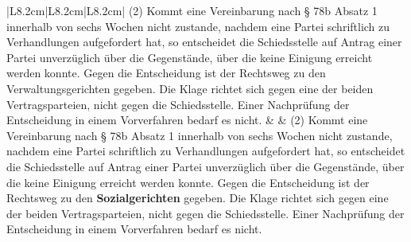 \documentclass[10pt,a4paper,landscape]{article}
\begin{document}
\begin{longtable}{|L{8.2cm}|L{8.2cm}|L{8.2cm}|}
(2) Kommt eine Vereinbarung nach \S{} 78b  \newline Absatz 1 innerhalb von sechs Wochen  \newline nicht zustande, nachdem eine Partei  \newline schriftlich zu Verhandlungen aufgefordert  \newline hat, so entscheidet die Schiedsstelle auf  \newline Antrag einer Partei unverzüglich über die  \newline Gegenstände, über die keine Einigung  \newline erreicht werden konnte. Gegen die  \newline Entscheidung ist der Rechtsweg zu den  \newline \textcolor{diffred}{Verwaltungsgerichten} gegeben. Die Klage  \newline richtet sich gegen eine der beiden  \newline Vertragsparteien, nicht gegen die  \newline Schiedsstelle. Einer Nachprüfung der  \newline Entscheidung in einem Vorverfahren bedarf  \newline es nicht. &  & (2) Kommt eine Vereinbarung nach \S{} 78b  \newline Absatz 1 innerhalb von sechs Wochen  \newline nicht zustande, nachdem eine Partei  \newline schriftlich zu Verhandlungen aufgefordert  \newline hat, so entscheidet die Schiedsstelle auf  \newline Antrag einer Partei unverzüglich über die  \newline Gegenstände, über die keine Einigung  \newline erreicht werden konnte. Gegen die  \newline Entscheidung ist der Rechtsweg zu den  \newline \textbf{\textcolor{diffgreen}{Sozialgerichten}} gegeben. Die Klage  \newline richtet sich gegen eine der beiden  \newline Vertragsparteien, nicht gegen die  \newline Schiedsstelle. Einer Nachprüfung der  \newline Entscheidung in einem Vorverfahren bedarf  \newline es nicht. \\
\hhline{|---|}

\end{longtable}
\end{document}
